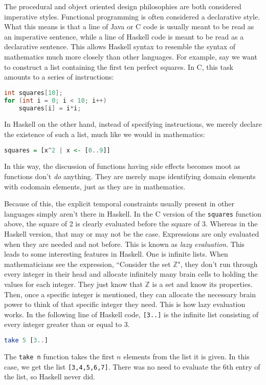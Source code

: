 \documentclass[MS, xcolor=dvipsnames]{wfuthesis}
\def\bZ{\mathbb{Z}}
\theoremstyle{definition}
\begin{document}
The procedural and object oriented design philosophies are both considered imperative styles. Functional programming is often considered a declarative style. What this means is that a line of Java or C code is usually meant to be read as an imperative sentence, while a line of Haskell code is meant to be read as a declarative sentence. This allows Haskell syntax to resemble the syntax of mathematics much more closely than other languages. For example, say we want to construct a list containing the first ten perfect squares. In C, this task amounts to a series of instructions:
\begin{lstlisting}[language=C]
int squares[10];
for (int i = 0; i < 10; i++)
    squares[i] = i*i;
\end{lstlisting}
In Haskell on the other hand, instead of specifying instructions, we merely declare the existence of such a list, much like we would in mathematics:
\begin{lstlisting}[language=Haskell]
squares = [x^2 | x <- [0..9]]
\end{lstlisting}
In this way, the discussion of functions having side effects becomes moot as functions don't \emph{do} anything. They are merely maps identifying domain elements with codomain elements, just as they are in mathematics. \par
Because of this, the explicit temporal constraints usually present in other languages simply aren't there in Haskell. In the C version of the \lstinline{squares} function above, the square of 2 is clearly evaluated before the square of 3. Whereas in the Haskell version, that may or may not be the case. Expressions are only evaluated when they are needed and not before. This is known as \emph{lazy evaluation}. This leads to some interesting features in Haskell. One is infinite lists. When mathematicians see the expression, ``Consider the set $\bZ$", they don't run through every integer in their head and allocate infinitely many brain cells to holding the values for each integer. They just know that $\bZ$ is a set and know its properties. Then, once a specific integer is mentioned, they can allocate the necessary brain power to think of that specific integer they need. This is how lazy evaluation works. In the following line of Haskell code, \lstinline{[3..]} is the infinite list consisting of every integer greater than or equal to 3.
\begin{lstlisting}[language=Haskell]
take 5 [3..]
\end{lstlisting}
The \lstinline{take n} function takes the first $n$ elements from the list it is given. In this case, we get the list \lstinline{[3,4,5,6,7]}. There was no need to evaluate the 6th entry of the list, so Haskell never did. \par
\end{document}

